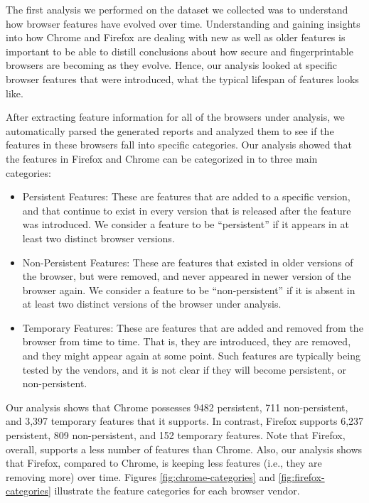 The first analysis we performed on the dataset we collected was to
understand how browser features have evolved over time. Understanding
and gaining insights into how Chrome and Firefox are dealing with new
as well as older features is important to be able to distill
conclusions about how secure and fingerprintable browsers are becoming
as they evolve. Hence, our analysis looked at specific browser
features that were introduced, what the typical lifespan of features
looks like.

After extracting feature information for all of the browsers under
analysis, we automatically parsed the generated reports and analyzed
them to see if the features in these browsers fall into specific
categories. Our analysis showed that the features in Firefox and
Chrome can be categorized in to three main categories:

\begin{itemize}
  
\item Persistent Features: These are features that are added to a
  specific version, and that continue to exist in every version that
  is released after the feature was introduced. We consider a feature
  to be ``persistent'' if it appears in at least two distinct browser
  versions.
      
\item Non-Persistent Features: These are features that existed in
  older versions of the browser, but were removed, and never appeared
  in newer version of the browser again. We consider a feature to be
  ``non-persistent'' if it is absent in at least two distinct versions
  of the browser under analysis.
      
\item Temporary Features: These are features that are added and
  removed from the browser from time to time. That is, they are
  introduced, they are removed, and they might appear again at some
  point. Such features are typically being tested by the vendors, and
  it is not clear if they will become persistent, or non-persistent.

\end{itemize}

Our analysis shows that Chrome possesses 9482 persistent, 711
non-persistent, and 3,397 temporary features that it supports. In
contrast, Firefox supports 6,237 persistent, 809 non-persistent, and
152 temporary features. Note that Firefox, overall, supports a less
number of features than Chrome. Also, our analysis shows that Firefox,
compared to Chrome, is keeping less features (i.e., they are removing
more) over time. Figures \ref{fig:chrome-categories} and
\ref{fig:firefox-categories} illustrate the feature categories for
each browser vendor.

